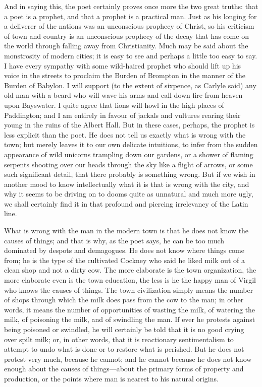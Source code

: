 \documentclass{book}
\begin{document}
And in saying this, the poet certainly proves once more the two great truths: that a poet is a prophet, and that a prophet is a practical man. Just as his longing for a deliverer of the nations was an unconscious prophecy of Christ, so his criticism of town and country is an unconscious prophecy of the decay that has come on the world through falling away from Christianity. Much may be said about the monstrosity of modern cities; it is easy to see and perhaps a little too easy to say. I have every sympathy with some wild-haired prophet who should lift up his voice in the streets to proclaim the Burden of Brompton in the manner of the Burden of Babylon. I will support (to the extent of sixpence, as Carlyle said) any old man with a beard who will wave his arms and call down fire from heaven upon Bayswater. I quite agree that lions will howl in the high places of Paddington; and I am entirely in favour of jackals and vultures rearing their young in the ruins of the Albert Hall. But in these cases, perhaps, the prophet is less explicit than the poet. He does not tell us exactly what is wrong with the town; but merely leaves it to our own delicate intuitions, to infer from the sudden appearance of wild unicorns trampling down our gardens, or a shower of flaming serpents shooting over our heads through the sky like a flight of arrows, or some such significant detail, that there probably is something wrong. But if we wish in another mood to know intellectually what it is that is wrong with the city, and why it seems to be driving on to dooms quite as unnatural and much more ugly, we shall certainly find it in that profound and piercing irrelevancy of the Latin line.

What is wrong with the man in the modern town is that he does not know the causes of things; and that is why, as the poet says, he can be too much dominated by despots and demagogues. He does not know where things come from; he is the type of the cultivated Cockney who said he liked milk out of a clean shop and not a dirty cow. The more elaborate is the town organization, the more elaborate even is the town education, the less is he the happy man of Virgil who knows the causes of things. The town civilization simply means the number of shops through which the milk does pass from the cow to the man; in other words, it means the number of opportunities of wasting the milk, of watering the milk, of poisoning the milk, and of swindling the man. If ever he protests against being poisoned or swindled, he will certainly be told that it is no good crying over spilt milk; or, in other words, that it is reactionary sentimentalism to attempt to undo what is done or to restore what is perished. But he does not protest very much, because he cannot; and he cannot because he does not know enough about the causes of things—about the primary forms of property and production, or the points where man is nearest to his natural origins.
\end{document}
